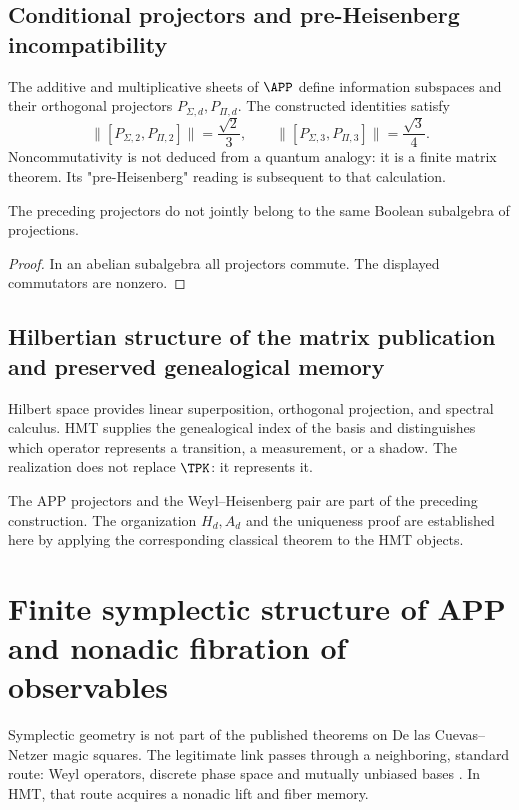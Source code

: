 \subsection{Conditional projectors and pre-Heisenberg incompatibility}

The additive and multiplicative sheets of \(\APP\) define information
subspaces and their orthogonal projectors
\(P_{\Sigma,d},P_{\Pi,d}\). The constructed identities satisfy
\[
 \|[P_{\Sigma,2},P_{\Pi,2}]\|
 =\frac{\sqrt2}{3},
 \qquad
 \|[P_{\Sigma,3},P_{\Pi,3}]\|
 =\frac{\sqrt3}{4}.
\]
Noncommutativity is not deduced from a quantum analogy: it is a finite
matrix theorem. Its "pre-Heisenberg" reading is subsequent to that calculation.

\begin{proposition}
The preceding projectors do not jointly belong to the same
Boolean subalgebra of projections.
\end{proposition}

\begin{proof}
In an abelian subalgebra all projectors commute. The displayed commutators
are nonzero.
\end{proof}

\subsection{Hilbertian structure of the matrix publication and preserved genealogical memory}

Hilbert space provides linear superposition, orthogonal projection,
and spectral calculus. HMT supplies the genealogical index of the basis and distinguishes
which operator represents a transition, a measurement, or a shadow. The
realization does not replace \(\TPK\): it represents it.

\begin{sourcebox}
The APP projectors and the Weyl--Heisenberg pair are part of the preceding
construction. The organization \(H_d,A_d\) and the uniqueness proof are established
here by applying the corresponding classical theorem to the HMT
objects.
\end{sourcebox}


\section{Finite symplectic structure of APP and nonadic fibration of observables}
\label{p12-83-c2-s4:gmc:chap:simplectica}

Symplectic geometry is not part of the published theorems on
De las Cuevas--Netzer magic squares. The legitimate link passes through a
neighboring, standard route: Weyl operators, discrete phase space and
mutually unbiased bases \citep{gibbons2004phase,planat2007rings}. In HMT,
that route acquires a nonadic lift and fiber memory.

